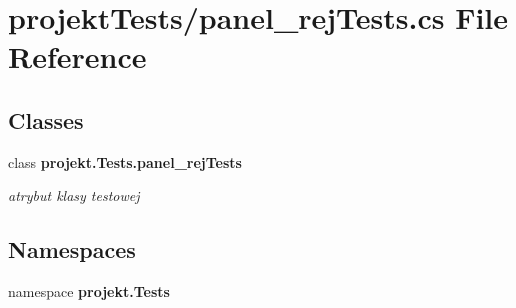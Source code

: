 \section{projekt\+Tests/panel\+\_\+rej\+Tests.cs File Reference}
\label{panel__rejTests_8cs}
\subsection*{Classes}
\begin{DoxyCompactItemize}
\item 
class \textbf{ projekt.\+Tests.\+panel\+\_\+rej\+Tests}
\begin{DoxyCompactList}\small\item\em atrybut klasy testowej \end{DoxyCompactList}\end{DoxyCompactItemize}
\subsection*{Namespaces}
\begin{DoxyCompactItemize}
\item 
namespace \textbf{ projekt.\+Tests}
\end{DoxyCompactItemize}
